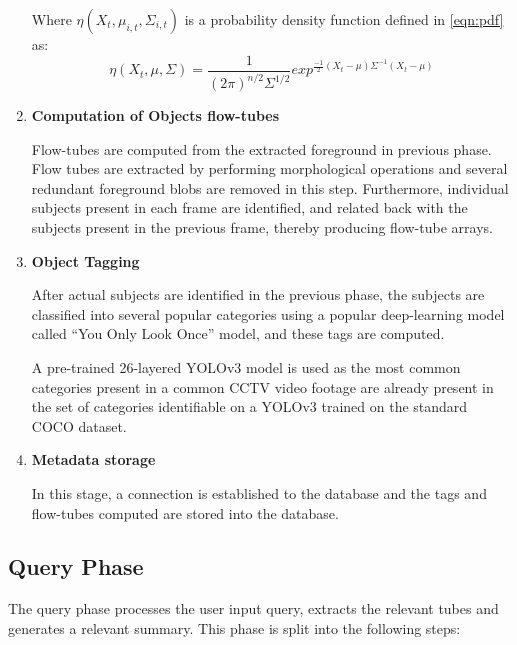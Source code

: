 \documentclass[conference]{IEEEtran}
\begin{document}
\begin{enumerate}
    Where \(\eta(X_{t},\mu_{i,t},\Sigma_{i,t})\) is a probability density function
    defined in \ref{eqn:pdf} as:
    \begin{equation}\label{eqn:pdf}
    \eta(X_{t},\mu,\Sigma) = \frac{1}{(2\pi)^{n/2}\Sigma^{1/2}}exp^{\frac{-1}{2}(X_t-\mu)\Sigma^{-1}(X_{t}-\mu)}
    \end{equation}


    \item \textbf{Computation of Objects flow-tubes}

	Flow-tubes are computed from the extracted foreground in previous phase.
    Flow tubes are extracted by performing morphological operations and several
    redundant foreground blobs are removed in this step. Furthermore, individual
    subjects present in each frame are identified, and related back with the
    subjects present in the previous frame, thereby producing flow-tube arrays.

    \item \textbf{Object Tagging}

    After actual subjects are identified in the previous phase, the subjects are
    classified into several popular categories using a popular deep-learning
    model called “You Only Look Once” model, and these tags are computed.

    A pre-trained 26-layered YOLOv3 model is used as the most common categories
    present in a common CCTV video footage are already present in the set of
    categories identifiable on a YOLOv3 trained on the standard COCO dataset.

    \item \textbf{Metadata storage}

    In this stage, a connection is established to the database and the tags and
    flow-tubes computed are stored into the database.
\end{enumerate}

\subsection{Query Phase}

The query phase processes the user input query, extracts the relevant tubes and
generates a relevant summary. This phase is split into the following steps:
\end{document}

